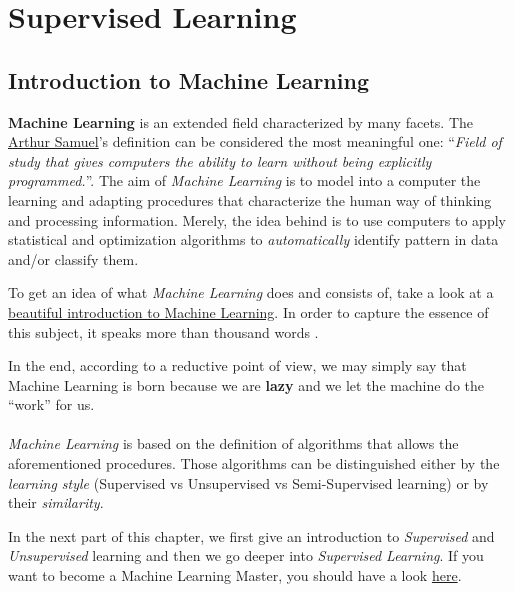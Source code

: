 

\section{Supervised Learning}

\subsection{Introduction to Machine Learning}

{\bf Machine Learning} is an extended field characterized by many facets. The  \href{https://en.wikipedia.org/wiki/Arthur\_Samuel}{Arthur Samuel}'s definition can be considered the most meaningful one: ``{\it Field of study that gives computers the ability to learn without being explicitly programmed.}''. The aim of \emph{Machine Learning} is to model into a computer the learning and adapting procedures that characterize the human way of thinking and processing information. Merely, the idea behind is to use computers to apply statistical and optimization algorithms to \emph{automatically} identify pattern in data and/or classify them. 

To get an idea of what \emph{Machine Learning} does and consists of, take a look at a \href{http://www.r2d3.us/visual-intro-to-machine-learning-part-1/}{beautiful introduction to Machine Learning}. In order to capture the essence of this subject, it speaks more than thousand words . 

In the end, according to a reductive point of view, we may simply say that Machine Learning is born because we are \textbf{lazy} and we let the machine do the ``work'' for us. 
\\\\
\emph{Machine Learning} is based on the definition of algorithms that allows the aforementioned procedures. Those algorithms can be distinguished either by the \emph{learning style} (Supervised vs Unsupervised vs Semi-Supervised learning) or by their \emph{similarity}. 

In the next part of this chapter, we first give an introduction to \emph{Supervised} and \emph{Unsupervised} learning and then we go deeper into \emph{Supervised Learning}. If you want to become a Machine Learning Master, you should have a look \href{http://machinelearningmastery.com/}{here}.

